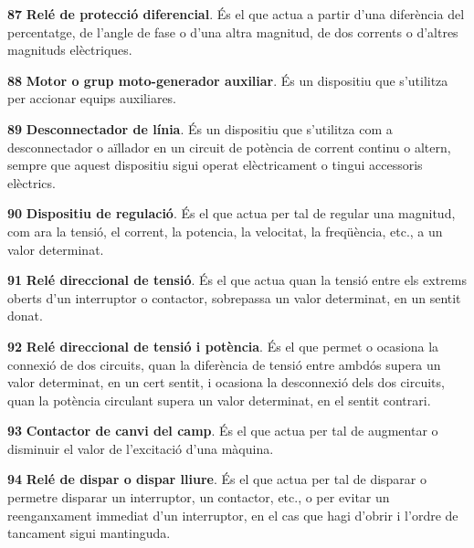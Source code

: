 \begin{multicols}{2}
\begin{list}{}
\item[\textbf{87}]   
\textbf{Relé de protecció
diferencial}. És el que actua a partir d'una diferència  del percentatge, de l'angle de fase o d'una altra magnitud, de dos corrents
o d'altres magnituds elèctriques.

\item[\textbf{88}]  
 \textbf{Motor o grup
moto-generador auxiliar}. És un dispositiu que s'utilitza per
accionar equips auxiliares.

\item[\textbf{89}]  
 \textbf{Desconnectador de línia}. És
un dispositiu que s'utilitza com a desconnectador o aïllador en un
circuit de potència de corrent continu o altern, sempre que aquest
dispositiu sigui operat elèctricament o tingui accessoris elèctrics.

\item[\textbf{90}]   
\textbf{Dispositiu de regulació}. És el que
actua per tal de regular una magnitud, com ara la tensió, el corrent, la potencia,
la velocitat, la freqüència, etc., a un valor determinat.

\item[\textbf{91}]   
\textbf{Relé direccional de tensió}.
És el que actua quan la tensió entre els extrems oberts d'un
interruptor o contactor, sobrepassa un valor determinat, en un
sentit donat.

\item[\textbf{92}]   
\textbf{Relé direccional
de tensió i potència}. És el que permet o ocasiona la connexió de
dos circuits, quan la diferència de tensió entre ambdós supera un
valor determinat, en un cert sentit, i ocasiona la desconnexió dels
dos circuits, quan la potència circulant supera un valor determinat,
en el sentit contrari.

\item[\textbf{93}]   
\textbf{Contactor de canvi del camp}. És el
que actua per tal de augmentar o disminuir el valor de l'excitació
d'una màquina.

\item[\textbf{94}]   
\textbf{Relé de dispar o dispar
lliure}. És el que actua per tal de disparar o permetre disparar un
interruptor, un contactor, etc., o per evitar un reenganxament
immediat d'un interruptor, en el cas que hagi d'obrir i l'ordre de
tancament sigui mantinguda.


\end{list}
\end{multicols}
